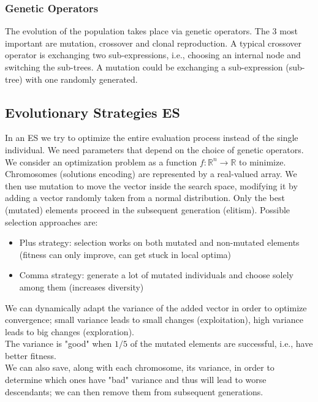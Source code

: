 \subsubsection{Genetic Operators}
The evolution of the population takes place via genetic operators. The 3 most important are mutation, crossover and clonal reproduction. A typical crossover operator is exchanging two sub-expressions, i.e., choosing an internal node and switching the sub-trees. A mutation could be exchanging a sub-expression (sub-tree) with one randomly generated.\\

\subsection{Evolutionary Strategies ES}

In an ES we try to optimize the entire evaluation process instead of the single individual. We need parameters that depend on the choice of genetic operators.\\
We consider an optimization problem as a function $f: \mathbb{R}^n \rightarrow \mathbb{R}$ to minimize. Chromosomes (solutions encoding) are represented by a real-valued array. We then use mutation to move the vector inside the search space, modifying it by adding a vector randomly taken from a normal distribution. Only the best (mutated) elements proceed in the subsequent generation (elitism). Possible selection approaches are:
\begin{itemize}
	\item Plus strategy: selection works on both mutated and non-mutated elements (fitness can only improve, can get stuck in local optima)
	\item Comma strategy: generate a lot of mutated individuals and choose solely among them (increases diversity)
\end{itemize}

We can dynamically adapt the variance of the added vector in order to optimize convergence; small variance leads to small changes (exploitation), high variance leads to big changes (exploration). \\

The variance is "good" when $1/5$ of the mutated elements are successful, i.e., have better fitness.\\
We can also save, along with each chromosome, its variance, in order to determine which ones have "bad" variance and thus will lead to worse descendants; we can then remove them from subsequent generations.\\

